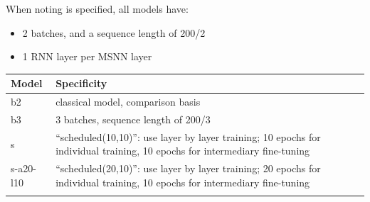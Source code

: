 When noting is specified, all models have:

\begin{itemize}
\tightlist
\item
  2 batches, and a sequence length of 200/2
\item
  1 RNN layer per MSNN layer
\end{itemize}

\begin{longtable}[]{@{}ll@{}}
\toprule
\begin{minipage}[b]{0.08\columnwidth}\raggedright\strut
Model\strut
\end{minipage} & \begin{minipage}[b]{0.86\columnwidth}\raggedright\strut
Specificity\strut
\end{minipage}\tabularnewline
\midrule
\endhead
\begin{minipage}[t]{0.08\columnwidth}\raggedright\strut
b2\strut
\end{minipage} & \begin{minipage}[t]{0.86\columnwidth}\raggedright\strut
classical model, comparison basis\strut
\end{minipage}\tabularnewline
\begin{minipage}[t]{0.08\columnwidth}\raggedright\strut
b3\strut
\end{minipage} & \begin{minipage}[t]{0.86\columnwidth}\raggedright\strut
3 batches, sequence length of 200/3\strut
\end{minipage}\tabularnewline
\begin{minipage}[t]{0.08\columnwidth}\raggedright\strut
s\strut
\end{minipage} & \begin{minipage}[t]{0.86\columnwidth}\raggedright\strut
``scheduled(10,10)'': use layer by layer training; 10 epochs for
individual training, 10 epochs for intermediary fine-tuning\strut
\end{minipage}\tabularnewline
\begin{minipage}[t]{0.08\columnwidth}\raggedright\strut
s-a20-l10\strut
\end{minipage} & \begin{minipage}[t]{0.86\columnwidth}\raggedright\strut
``scheduled(20,10)'': use layer by layer training; 20 epochs for
individual training, 10 epochs for intermediary fine-tuning\strut
\end{minipage}\tabularnewline
\begin{minipage}[t]{0.08\columnwidth}\raggedright\strut

\end{minipage}
\end{longtable}
